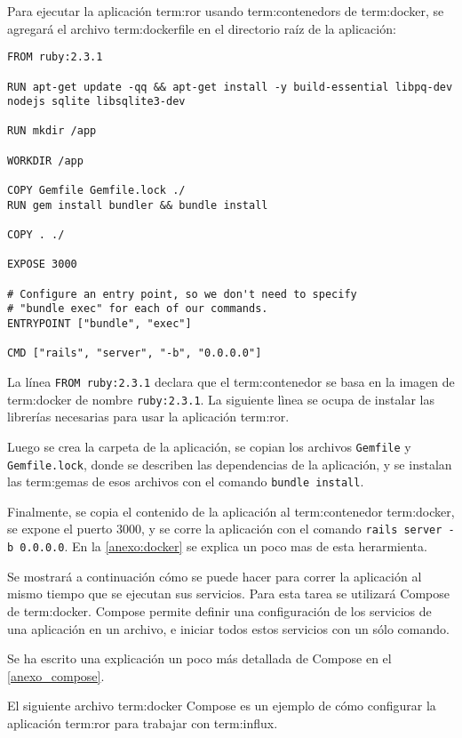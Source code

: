 Para ejecutar la aplicación \gls{term:ror} usando \glspl{term:contenedor} de
\gls{term:docker}, se agregará el archivo \gls{term:dockerfile} en el directorio
raíz de la aplicación:

\begin{lstlisting}
FROM ruby:2.3.1

RUN apt-get update -qq && apt-get install -y build-essential libpq-dev nodejs sqlite libsqlite3-dev

RUN mkdir /app

WORKDIR /app

COPY Gemfile Gemfile.lock ./
RUN gem install bundler && bundle install

COPY . ./

EXPOSE 3000

# Configure an entry point, so we don't need to specify 
# "bundle exec" for each of our commands.
ENTRYPOINT ["bundle", "exec"]

CMD ["rails", "server", "-b", "0.0.0.0"]
\end{lstlisting}

La línea \lstinline{FROM ruby:2.3.1} declara que el \gls{term:contenedor} se
basa en la imagen de \gls{term:docker} de nombre \lstinline{ruby:2.3.1}. La
siguiente lìnea se ocupa de instalar las librerías necesarias para usar la
aplicación \gls{term:ror}.

Luego se crea la carpeta de la aplicación, se copian los archivos
\lstinline{Gemfile} y \lstinline{Gemfile.lock}, donde se describen las
dependencias de la aplicación, y se instalan las \glspl{term:gema} de esos
archivos con el comando \lstinline{bundle install}.

Finalmente, se copia el contenido de la aplicación al \gls{term:contenedor}
\gls{term:docker}, se expone el puerto 3000, y se corre la aplicación con el
comando \lstinline{rails server -b 0.0.0.0}. En la \autoref{anexo:docker}
se explica un poco mas de esta herarmienta.

Se mostrará a continuación cómo se puede hacer para correr la aplicación al
mismo tiempo que se ejecutan sus servicios. Para esta tarea se utilizará
Compose de \gls{term:docker}. Compose permite definir una
configuración de los servicios de una aplicación en un archivo, e iniciar todos
estos servicios con un sólo comando.

Se ha escrito una explicación un poco más detallada de Compose en el
\autoref{anexo_compose}.

El siguiente archivo \gls{term:docker} Compose es un ejemplo de cómo configurar
la aplicación \gls{term:ror} para trabajar con \gls{term:influx}.

